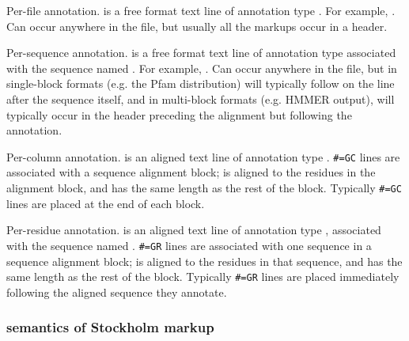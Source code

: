 \begin{wideitem}
\item [\emprog{\#=GF <tag> <s>}]
        Per-file annotation.  is a free format text line
        of annotation type . For example, . Can occur anywhere in the file, but usually
        all the  markups occur in a header.

\item [\emprog{\#=GS <seqname> <tag> <s>}]
        Per-sequence annotation.  is a free format text line
        of annotation type  associated with the sequence
        named . For example, . Can occur anywhere
        in the file, but in single-block formats (e.g. the Pfam
        distribution) will typically follow on the line after the
        sequence itself, and in multi-block formats (e.g. HMMER
        output), will typically occur in the header preceding the
        alignment but following the  annotation.

\item [\emprog{\#=GC <tag> <...s...>}]
        Per-column annotation.  is an aligned text line
        of annotation type .
        \verb+#=GC+ lines are
        associated with a sequence alignment block; 
        is aligned to the residues in the alignment block, and has
        the same length as the rest of the block.
        Typically \verb+#=GC+ lines are placed at the end of each block.

\item [\emprog{\#=GR <seqname> <tag> <.....s.....>}]
        Per-residue annotation.  is an aligned text line
        of annotation type , associated with the sequence
        named . 
        \verb+#=GR+ lines are 
        associated with one sequence in a sequence alignment block; 
        is aligned to the residues in that sequence, and has
        the same length as the rest of the block.
        Typically
        \verb+#=GR+ lines are placed immediately following the
        aligned sequence they annotate.
\end{wideitem}

\subsubsection{semantics of Stockholm markup}

